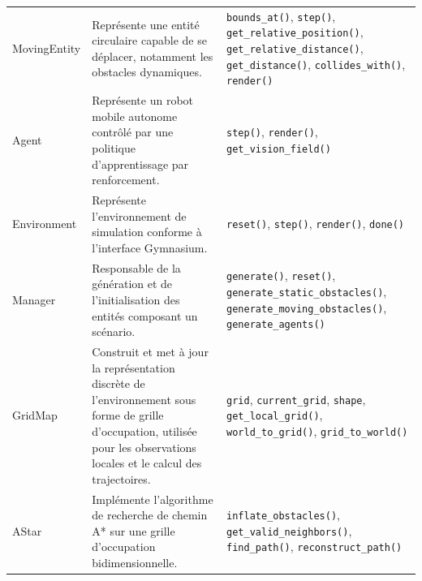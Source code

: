 \begin{longtable}{
        >{\ttfamily\small}p{}
        p{}
        >{\ttfamily\small}p{}
    }
    MovingEntity
                                 & Représente une entité circulaire capable de se déplacer, notamment les obstacles dynamiques.                                                                                   & \texttt{bounds\_at()}, \texttt{step()}, \texttt{get\_relative\_position()}, \texttt{get\_relative\_distance()}, \texttt{get\_distance()}, \texttt{collides\_with()}, \texttt{render()} \\



    Agent
                                 & Représente un robot mobile autonome contrôlé par une politique d'apprentissage par renforcement.                                                                               & \texttt{step()}, \texttt{render()}, \texttt{get\_vision\_field()}                                                                                                                      \\


    Environment
                                 & Représente l'environnement de simulation conforme à l'interface Gymnasium.                                                                                                     & \texttt{reset()}, \texttt{step()}, \texttt{render()}, \texttt{done()}                                                                                                                  \\

    Manager
                                 & Responsable de la génération et de l'initialisation des entités composant un scénario.                                                                                         & \texttt{generate()}, \texttt{reset()}, \texttt{generate\_static\_obstacles()}, \texttt{generate\_moving\_obstacles()}, \texttt{generate\_agents()}                                     \\

    GridMap
                                 & Construit et met à jour la représentation discrète de l'environnement sous forme de grille d'occupation, utilisée pour les observations locales et le calcul des trajectoires. & \texttt{grid}, \texttt{current\_grid}, \texttt{shape}, \texttt{get\_local\_grid()}, \texttt{world\_to\_grid()}, \texttt{grid\_to\_world()}                                             \\

    AStar
                                 & Implémente l'algorithme de recherche de chemin A* sur une grille d'occupation bidimensionnelle.                                                                                & \texttt{inflate\_obstacles()}, \texttt{get\_valid\_neighbors()}, \texttt{find\_path()}, \texttt{reconstruct\_path()}                                                                   \\


\end{longtable}

